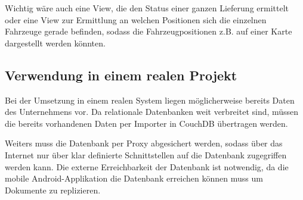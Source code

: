 Wichtig wäre auch eine View, die den Status einer ganzen Lieferung ermittelt oder
	eine View zur Ermittlung an welchen Positionen sich die einzelnen Fahrzeuge
	gerade befinden, sodass die Fahrzeugpositionen z.B. auf einer Karte dargestellt
	werden könnten.

\subsection{Verwendung in einem realen Projekt}

Bei der Umsetzung in einem realen System liegen möglicherweise bereits Daten des
 	Unternehmens vor. Da relationale Datenbanken weit verbreitet sind, müssen die
	bereits vorhandenen Daten per Importer in CouchDB übertragen werden.

Weiters muss die Datenbank per Proxy abgesichert werden, sodass über das Internet
	nur über klar definierte Schnittstellen auf die Datenbank zugegriffen werden
	kann. Die externe Erreichbarkeit der Datenbank ist notwendig, da die mobile
	Android-Applikation die Datenbank erreichen können muss um Dokumente zu replizieren.